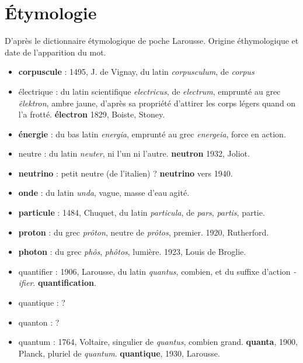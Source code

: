 
\chapter{Étymologie}
%
D'après le dictionnaire étymologique de poche Larousse. Origine éthymologique et date de l'apparition du mot.

\begin{itemize}[leftmargin=1cm, label=, itemsep=3pt]
\item {\bf corpuscule} : 1495, J. de Vignay, du latin {\it corpusculum}, de {\it corpus}
\item électrique : du latin scientifique {\it electricus}, de {\it electrum}, emprunté au grec {\it êlektron}, ambre jaune, d'après sa propriété d'attirer les corps légers quand on l'a frotté. {\bf électron} 1829, Boiste, Stoney.
\item {\bf énergie} : du bas latin {\it energia}, emprunté au grec {\it energeia}, force en action.
\item neutre : du latin {\it neuter}, ni l'un ni l'autre. {\bf neutron} 1932, Joliot.
\item {\bf neutrino} : petit neutre (de l'italien) ? {\bf neutrino} vers 1940.
\item {\bf onde} : du latin {\it unda}, vague, masse d'eau agité.
\item {\bf particule} : 1484, Chuquet, du latin {\it particula}, de {\it pars}, {\it partis}, partie.
\item {\bf proton} : du grec {\it prôton}, neutre de {\it prôtos}, premier. 1920, Rutherford.
\item {\bf photon} : du grec {\it phôs}, {\it phôtos}, lumière. 1923, Louis de Broglie.
\item quantifier : 1906, Larousse, du latin {\it quantus}, combien, et du suffixe d'action {\it -ifier}. {\bf quantification}.
\item quantique : ?
\item quanton : ?
\item quantum : 1764, Voltaire, singulier de {\it quantus}, combien grand. {\bf quanta}, 1900, Planck, pluriel de {\it quantum}. {\bf quantique}, 1930, Larousse.
\end{itemize}





